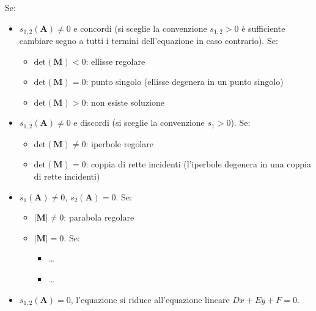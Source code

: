 \documentclass[letterpaper,10pt,italian]{jupyterBook}
\begin{document}
\sphinxAtStartPar
Se:
\begin{itemize}
\item {} 
\sphinxAtStartPar
\(s_{1,2}(\mathbf{A}) \ne 0\) e concordi (si sceglie la convenzione \(s_{1,2} > 0\) \sphinxhyphen{} è sufficiente cambiare segno a tutti i termini dell’equazione in caso contrario). Se:
\begin{itemize}
\item {} 
\sphinxAtStartPar
\(\text{det}(\mathbf{M}) < 0\): ellisse regolare

\item {} 
\sphinxAtStartPar
\(\text{det}(\mathbf{M}) = 0\): punto singolo (ellisse degenera in un punto singolo)

\item {} 
\sphinxAtStartPar
\(\text{det}(\mathbf{M}) > 0\): non esiste soluzione

\end{itemize}

\item {} 
\sphinxAtStartPar
\(s_{1,2}(\mathbf{A}) \ne 0\) e discordi (si sceglie la convenzione \(s_1 > 0\)). Se:
\begin{itemize}
\item {} 
\sphinxAtStartPar
\(\text{det}(\mathbf{M}) \ne 0\): iperbole regolare

\item {} 
\sphinxAtStartPar
\(\text{det}(\mathbf{M}) = 0\): coppia di rette incidenti (l’iperbole degenera in una coppia di rette incidenti)

\end{itemize}

\item {} 
\sphinxAtStartPar
\(s_{1}(\mathbf{A}) \ne 0\), \(s_2(\mathbf{A}) = 0\). Se:
\begin{itemize}
\item {} 
\sphinxAtStartPar
\(|\mathbf{M}| \ne 0\): parabola regolare

\item {} 
\sphinxAtStartPar
\(|\mathbf{M}| = 0\). Se:
\begin{itemize}
\item {} 
\sphinxAtStartPar
…

\item {} 
\sphinxAtStartPar
…

\end{itemize}

\end{itemize}

\item {} 
\sphinxAtStartPar
\(s_{1,2}(\mathbf{A}) = 0\), l’equazione si riduce all’equazione lineare \(D x + E y + F = 0\).

\end{itemize}
\end{document}
